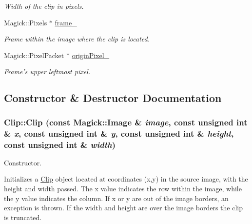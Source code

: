 \begin{CompactItemize}
\begin{CompactList}\small\item\em Width of the clip in pixels. \item\end{CompactList}\item 
Magick::Pixels $\ast$ \hyperlink{class_clip_2afdfb2cc29e6a97c70e55d5393e3a80}{frame\_\-}
\begin{CompactList}\small\item\em Frame within the image where the clip is located. \item\end{CompactList}\item 
Magick::PixelPacket $\ast$ \hyperlink{class_clip_593bf304450ff4c7fe4ded74dff1c188}{originPixel\_\-}
\begin{CompactList}\small\item\em Frame's upper leftmost pixel. \item\end{CompactList}\end{CompactItemize}


\subsection{Constructor \& Destructor Documentation}
\hypertarget{class_clip_cf1b75d1f0a7b7fb4c9b7cf6fe904bde}{
\subsubsection[Clip]{\setlength{\rightskip}{0pt plus 5cm}Clip::Clip (const Magick::Image \& {\em image}, \/  const unsigned int \& {\em x}, \/  const unsigned int \& {\em y}, \/  const unsigned int \& {\em height}, \/  const unsigned int \& {\em width})}}
\label{class_clip_cf1b75d1f0a7b7fb4c9b7cf6fe904bde}


Constructor. 

Initializes a \hyperlink{class_clip}{Clip} object located at coordinates (x,y) in the source image, with the height and width passed. The x value indicates the row within the image, while the y value indicates the column. If x or y are out of the image borders, an exception is thrown. If the width and height are over the image borders the clip is truncated.

